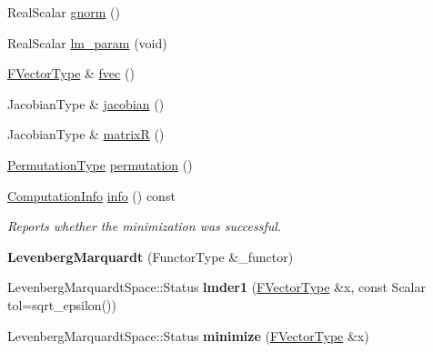 \begin{DoxyCompactItemize}
Real\+Scalar \hyperlink{class_eigen_1_1_levenberg_marquardt_ab91ec0507fb508a2402ac0dfa15af776}{gnorm} ()
\item 
Real\+Scalar \hyperlink{class_eigen_1_1_levenberg_marquardt_aa8aa0d8c1dab58ac51df999587609e09}{lm\+\_\+param} (void)
\item 
\hyperlink{group___core___module}{F\+Vector\+Type} \& \hyperlink{class_eigen_1_1_levenberg_marquardt_a6c296a4a5b91f0ecc398b479a67c242d}{fvec} ()
\item 
Jacobian\+Type \& \hyperlink{class_eigen_1_1_levenberg_marquardt_aaf2179310fdf873483f5d8b46f15da8c}{jacobian} ()
\item 
Jacobian\+Type \& \hyperlink{class_eigen_1_1_levenberg_marquardt_afd6cd64fdd7ca32cc71a83d91432ea69}{matrixR} ()
\item 
\hyperlink{group___core___module}{Permutation\+Type} \hyperlink{class_eigen_1_1_levenberg_marquardt_a691142ba877e072c58016b4be77e9855}{permutation} ()
\item 
\hyperlink{group__enums_ga85fad7b87587764e5cf6b513a9e0ee5e}{Computation\+Info} \hyperlink{class_eigen_1_1_levenberg_marquardt_ae65bdccd2487989ae9b25f9c2e9dfab9}{info} () const
\begin{DoxyCompactList}\small\item\em Reports whether the minimization was successful. \end{DoxyCompactList}\item 
\mbox{\label{class_eigen_1_1_levenberg_marquardt_abb90eff5a097e6558dd5be015691affd}} 
{\bfseries Levenberg\+Marquardt} (Functor\+Type \&\+\_\+functor)
\item 
\mbox{\label{class_eigen_1_1_levenberg_marquardt_abb948f8bbcb5ea8a571c8a3def531501}} 
Levenberg\+Marquardt\+Space\+::\+Status {\bfseries lmder1} (\hyperlink{group___core___module}{F\+Vector\+Type} \&x, const Scalar tol=sqrt\+\_\+epsilon())
\item 
\mbox{\label{class_eigen_1_1_levenberg_marquardt_a5b7c5decf3d9a37c6cfacf795766e928}} 
Levenberg\+Marquardt\+Space\+::\+Status {\bfseries minimize} (\hyperlink{group___core___module}{F\+Vector\+Type} \&x)
\item 
\mbox{\label{class_eigen_1_1_levenberg_marquardt_ad22b48fa04cad42ea372101d3e1e0e72}} 

\end{DoxyCompactItemize}
